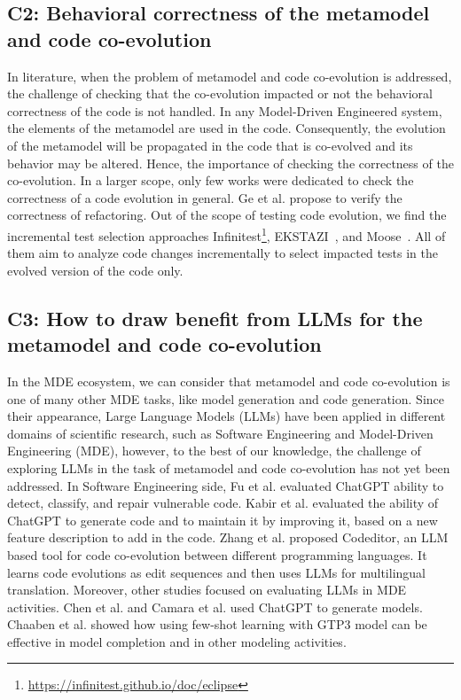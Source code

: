  

\subsection*{C2: Behavioral correctness of the metamodel and code co-evolution}
\label{C2}
In literature, when the problem of metamodel and code co-evolution is addressed, the challenge of checking that the co-evolution impacted or not the behavioral correctness of the code is not handled. In any Model-Driven Engineered system, the elements of the metamodel are used in the code. Consequently, the evolution of the metamodel will be propagated in the code that is co-evolved and its behavior may be altered. Hence, the importance of checking the correctness of the co-evolution. In a larger scope, only few works were dedicated to check the correctness of a code evolution in general. %
 Ge et al. \cite{10.1145/2568225.2568280} propose to verify the correctness of refactoring.
Out of the scope of testing code evolution, we find the incremental test selection approaches Infinitest\footnote{\url{https://infinitest.github.io/doc/eclipse}}, EKSTAZI~\cite{7203050}, and Moose~\cite{ducasse2000moose}. All of them aim to analyze code changes incrementally to select impacted tests in the evolved version of the code only.

\subsection*{C3: How to draw benefit from LLMs for the metamodel and code co-evolution}
\label{C3}
In the MDE ecosystem, we can consider that metamodel and code co-evolution is one of many other MDE tasks, like model generation and code generation. Since their appearance, Large Language Models (LLMs) have been applied in different domains of scientific research, such as Software Engineering and Model-Driven Engineering (MDE), however, to the best of our knowledge, the challenge of exploring LLMs in the task of metamodel and code co-evolution has not yet been addressed. In Software Engineering side, Fu et al. \cite{fu2023chatgpt} evaluated ChatGPT ability to detect, classify, and repair vulnerable code. Kabir et al. \cite{kabir2023empirical} evaluated the ability of ChatGPT to generate code and to maintain it by improving it, based on a new feature description to add in the code. Zhang et al. \cite{zhang2023multilingual} proposed Codeditor, an LLM based tool for code co-evolution between different programming languages. It learns code evolutions as edit sequences and then uses LLMs for multilingual translation.
Moreover, other studies focused on evaluating LLMs in MDE activities. 
Chen et al. \cite{10344012} and Camara et al. \cite{camara2023assessment} used ChatGPT to generate models.
Chaaben et al. \cite{chaaben2023towards} showed how using few-shot learning with GTP3 model can be effective in model completion and in other modeling activities. 
%
